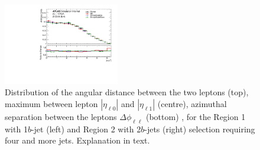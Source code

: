 \begin{figure}[!htb]
\includegraphics[width=0.45\textwidth]{Plots/ttV/shape/c_Region_1_lep_dPhi} 
  \caption{Distribution of the angular distance between the two leptons (top), maximum between lepton $|\eta_{\ell 0}|$ and $|\eta_{\ell 1}|$ (centre), azimuthal separation between the leptons $\Delta \phi _{\ell \ell }$ (bottom) , for the Region 1 with 1$b$-jet (left) and Region 2 with 2$b$-jets (right) selection requiring four and more jets. Explanation in text.
   \label{ttV:ll_kin}}
\end{figure}
% 



